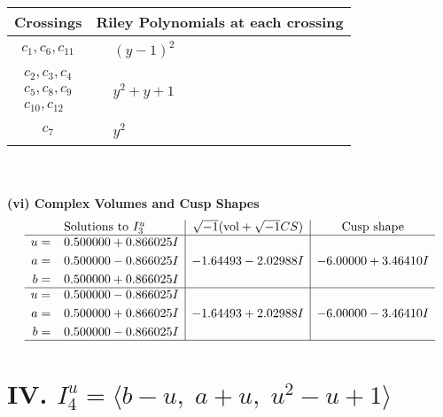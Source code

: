 \documentclass[1p]{elsarticle_modified}
\theoremstyle{definition}
\newcommand{\I}{\sqrt{-1}}
\begin{document}
\begin{tabular}{m{50pt}|m{274pt}}
Crossings & \hspace{64pt}Riley Polynomials at each crossing \\
\hline $$\begin{aligned}c_{1},c_{6},c_{11}\end{aligned}$$&$\begin{aligned}
&(y-1)^2
\end{aligned}$\\
\hline $$\begin{aligned}c_{2},c_{3},c_{4}\\c_{5},c_{8},c_{9}\\c_{10},c_{12}\end{aligned}$$&$\begin{aligned}
&y^2+y+1
\end{aligned}$\\
\hline $$\begin{aligned}c_{7}\end{aligned}$$&$\begin{aligned}
&y^2
\end{aligned}$\\
\hline
\end{tabular}\\~\\
\newpage\flushleft \textbf{(vi) Complex Volumes and Cusp Shapes}
$$\begin{array}{c|c|c}  
\text{Solutions to }I^u_{3}& \I (\text{vol} + \sqrt{-1}CS) & \text{Cusp shape}\\
 \hline 
\begin{aligned}
u &= \phantom{-}0.500000 + 0.866025 I \\
a &= \phantom{-}0.500000 - 0.866025 I \\
b &= \phantom{-}0.500000 + 0.866025 I\end{aligned}
 & -1.64493 - 2.02988 I & -6.00000 + 3.46410 I \\ \hline\begin{aligned}
u &= \phantom{-}0.500000 - 0.866025 I \\
a &= \phantom{-}0.500000 + 0.866025 I \\
b &= \phantom{-}0.500000 - 0.866025 I\end{aligned}
 & -1.64493 + 2.02988 I & -6.00000 - 3.46410 I\\
 \hline 
 \end{array}$$\newpage\newpage\renewcommand{\arraystretch}{1}
\centering \section*{IV. $I^u_{4}= \langle b- u,\;a+u,\;u^2- u+1 \rangle$}
\end{document}
